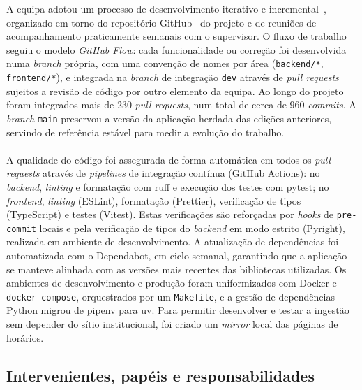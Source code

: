\documentclass[10pt]{article}
\begin{document}
    A equipa adotou um processo de desenvolvimento iterativo e incremental~\cite{despa2014comparative}, organizado em torno do repositório GitHub~\cite{github} do projeto e de reuniões de acompanhamento praticamente semanais com o supervisor.
    O fluxo de trabalho seguiu o modelo \emph{GitHub Flow}: cada funcionalidade ou correção foi desenvolvida numa \emph{branch} própria, com uma convenção de nomes por área (\texttt{backend/*}, \texttt{frontend/*}), e integrada na \emph{branch} de integração \texttt{dev} através de \emph{pull requests} sujeitos a revisão de código por outro elemento da equipa. Ao longo do projeto foram integrados mais de 230 \emph{pull requests}, num total de cerca de 960 \emph{commits}. A \emph{branch} \texttt{main} preservou a versão da aplicação herdada das edições anteriores, servindo de referência estável para medir a evolução do trabalho.\\
    \\
    A qualidade do código foi assegurada de forma automática em todos os \emph{pull requests} através de \emph{pipelines} de integração contínua (GitHub Actions): no \emph{backend}, \emph{linting} e formatação com ruff e execução dos testes com pytest; no \emph{frontend}, \emph{linting} (ESLint), formatação (Prettier), verificação de tipos (TypeScript) e testes (Vitest). Estas verificações são reforçadas por \emph{hooks} de \texttt{pre-commit} locais e pela verificação de tipos do \emph{backend} em modo estrito (Pyright), realizada em ambiente de desenvolvimento. A atualização de dependências foi automatizada com o Dependabot, em ciclo semanal, garantindo que a aplicação se manteve alinhada com as versões mais recentes das bibliotecas utilizadas. Os ambientes de desenvolvimento e produção foram uniformizados com Docker e \texttt{docker-compose}, orquestrados por um \texttt{Makefile}, e a gestão de dependências Python migrou de pipenv para uv. Para permitir desenvolver e testar a ingestão sem depender do sítio institucional, foi criado um \emph{mirror} local das páginas de horários.
	
	
\subsection{Intervenientes, papéis e responsabilidades}
\end{document}

